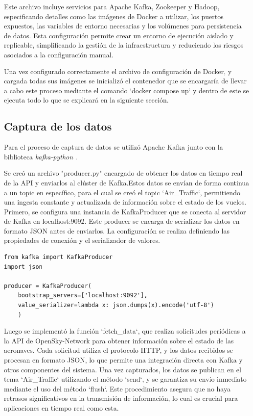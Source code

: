 \documentclass{article}
\begin{document}
Este archivo incluye servicios para Apache Kafka, Zookeeper y Hadoop, especificando detalles como las imágenes de Docker a utilizar, los puertos expuestos, las variables de entorno necesarias y los volúmenes para persistencia de datos. Esta configuración permite crear un entorno de ejecución aislado y replicable, simplificando la gestión de la infraestructura y reduciendo los riesgos asociados a la configuración manual.

Una vez configurado correctamente el archivo de configuración de Docker, y cargada todas sus imágenes se inicializó el contenedor que se encargaría de llevar a cabo este proceso mediante el comando `docker compose up` y dentro de este se ejecuta todo lo que se explicará en la siguiente sección.

\subsection{Captura de los datos}

Para el proceso de captura de datos se utilizó Apache Kafka junto con la biblioteca \textit{kafka-python} \cite{KafkaPython}.

Se creó un archivo "producer.py" encargado de obtener los datos en tiempo real de la API  y enviarlos al clúster de Kafka.Estos datos se envían de forma continua a un topic en específico, para el cual se creó el topic `Air\_Traffic`, permitiendo una ingesta constante y actualizada de información sobre el estado de los vuelos.
Primero, se configura una instancia de KafkaProducer que se conecta al servidor de Kafka en localhost:9092. Este producer se encarga de serializar los datos en formato JSON antes de enviarlos. La configuración se realiza definiendo las propiedades de conexión y el serializador de valores.

\begin{lstlisting}[style=python]
from kafka import KafkaProducer
import json

producer = KafkaProducer(
    bootstrap_servers=['localhost:9092'],
    value_serializer=lambda x: json.dumps(x).encode('utf-8')
    )
\end{lstlisting}

Luego se implementó la función `fetch\_data`, que realiza solicitudes periódicas a la API de OpenSky-Network para obtener información sobre el estado de las aeronaves. Cada solicitud utiliza el protocolo HTTP, y los datos recibidos se procesan en formato JSON, lo que permite una integración directa con Kafka y otros componentes del sistema.
Una vez capturados, los datos se publican en el tema `Air\_Traffic` utilizando el método `send`, y se garantiza su envío inmediato mediante el uso del método `flush`. Este procedimiento asegura que no haya retrasos significativos en la transmisión de información, lo cual es crucial para aplicaciones en tiempo real como esta.
\end{document}
